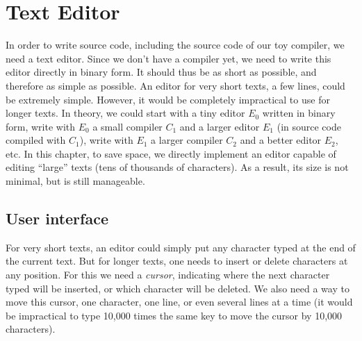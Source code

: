 
\renewcommand{\rustfile}{chapter2}
\setcounter{rustid}{0}


\chapter{Text Editor}\label{chapter:text-editor}

In order to write source code, including the source code of our toy compiler,
we need a text editor. Since we don't have a compiler yet, we need to write
this editor directly in binary form. It should thus be as short as possible,
and therefore as simple as possible. An editor for very short texts, a few
lines, could be extremely simple. However, it would be completely impractical
to use for longer texts. In theory, we could start with a tiny editor $E_0$
written in binary form, write with $E_0$ a small compiler $C_1$ and a larger
editor $E_1$ (in source code compiled with $C_1$), write with $E_1$ a larger
compiler $C_2$ and a better editor $E_2$, etc. In this chapter, to save space,
we directly implement an editor capable of editing ``large'' texts (tens of
thousands of characters). As a result, its size is not minimal, but is still
manageable.

\section{User interface}

For very short texts, an editor could simply put any character typed at the end
of the current text. But for longer texts, one needs to insert or delete
characters at any position. For this we need a {\em cursor}, indicating where
the next character typed will be inserted, or which character will be deleted.
We also need a way to move this cursor, one character, one line, or even
several lines at a time (it would be impractical to type 10,000 times the same
key to move the cursor by 10,000 characters).


